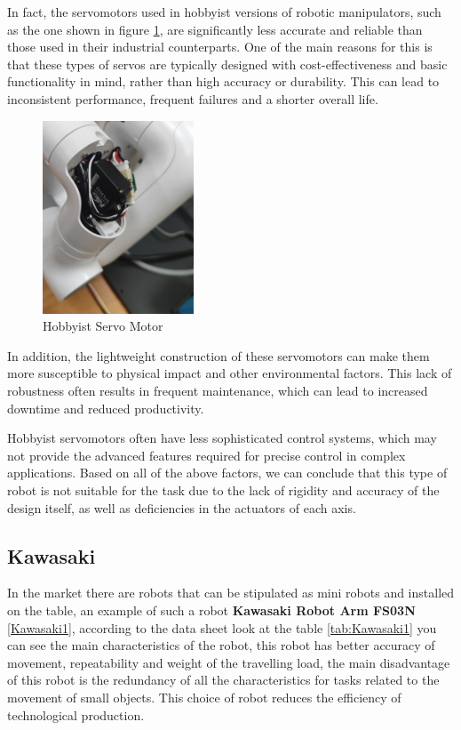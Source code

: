 In fact, the servomotors used in hobbyist versions of robotic manipulators, such as the one shown in figure \ref{mycobot3}, are significantly less accurate and reliable than those used in their industrial counterparts. One of the main reasons for this is that these types of servos are typically designed with cost-effectiveness and basic functionality in mind, rather than high accuracy or durability. This can lead to inconsistent performance, frequent failures and a shorter overall life.


\begin{figure}[H]
	\centering
	\includegraphics[width=0.4\textwidth]{Src/images/mycobot3.png}
	\caption{Hobbyist Servo Motor}
    \label{mycobot3}
\end{figure}


In addition, the lightweight construction of these servomotors can make them more susceptible to physical impact and other environmental factors. This lack of robustness often results in frequent maintenance, which can lead to increased downtime and reduced productivity.

Hobbyist servomotors often have less sophisticated control systems, which may not provide the advanced features required for precise control in complex applications. 
Based on all of the above factors, we can conclude that this type of robot is not suitable for the task due to the lack of rigidity and accuracy of the design itself, as well as deficiencies in the actuators of each axis.

\subsection*{Kawasaki}

In the market there are robots that can be stipulated as mini robots and installed on the table, an example of such a robot \textbf{Kawasaki Robot Arm FS03N} \ref{Kawasaki1}, according to the data sheet look at the table \ref{tab:Kawasaki1} you can see the main characteristics of the robot, this robot has better accuracy of movement, repeatability and weight of the travelling load, the main disadvantage of this robot is the redundancy of all the characteristics for tasks related to the movement of small objects. This choice of robot reduces the efficiency of technological production.


